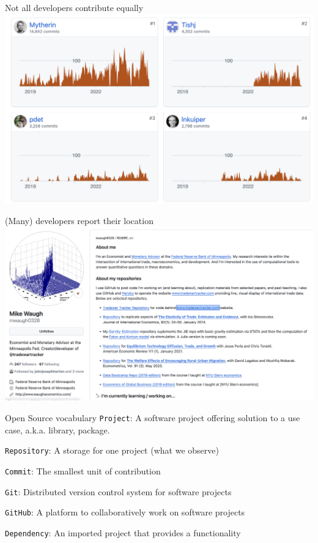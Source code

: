 \documentclass[
  ignorenonframetext,
  aspectratio=169,
]{beamer}
\begin{document}
\begin{frame}{Not all developers contribute equally}
\protect\hypertarget{not-all-developers-contribute-equally}{}
\includegraphics{images/collaboration-time.png}
\end{frame}

\begin{frame}{(Many) developers report their location}
\protect\hypertarget{many-developers-report-their-location}{}
\includegraphics{images/mike-waugh-github.png}
\end{frame}

\begin{frame}[fragile]{Open Source vocabulary}
\protect\hypertarget{open-source-vocabulary}{}
\texttt{Project}: A software project offering solution to a use case,
a.k.a. library, package.

\texttt{Repository}: A storage for one project (what we observe)

\texttt{Commit}: The smallest unit of contribution

\texttt{Git}: Distributed version control system for software projects

\texttt{GitHub}: A platform to collaboratively work on software projects

\texttt{Dependency}: An imported project that provides a functionality
\end{frame}
\end{document}
